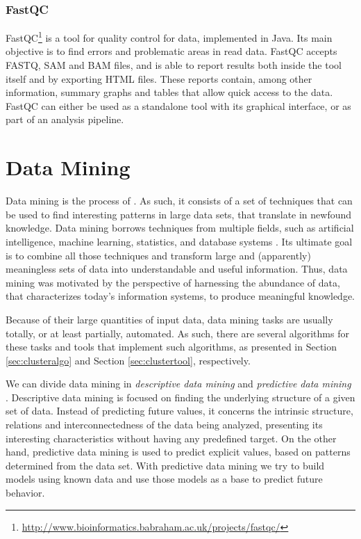 \subsubsection*{FastQC}

FastQC\footnote{\url{http://www.bioinformatics.babraham.ac.uk/projects/fastqc/}}
is a tool for quality control for \ngs{} data, implemented in Java. Its main
objective is to find errors and problematic areas in \ngs{} read data. FastQC
accepts FASTQ, SAM and BAM files, and is able to report results both inside the
tool itself and by exporting HTML files. These reports contain, among other
information, summary graphs and tables that allow quick access to the data.
FastQC can either be used as a standalone tool with its graphical interface, or
as part of an analysis pipeline.

\section{Data Mining}\label{sec:mlearning}


Data mining is the process of  \cite[p. 5]{han2006data}. As such, it consists of a
set of techniques that can be used to find interesting patterns in large data
sets, that translate in newfound knowledge. Data mining borrows techniques from
multiple fields, such as artificial intelligence, machine learning, statistics,
and database systems \cite{Chakrabarti2012}. Its ultimate goal is to combine all
those techniques and transform large and (apparently) meaningless sets of data
into understandable and useful information. Thus, data mining was motivated by
the perspective of harnessing the abundance of data, that characterizes today's
information systems, to produce meaningful knowledge.

Because of their large quantities of input data, data mining tasks are usually
totally, or at least partially, automated. As such, there are several algorithms
for these tasks and tools that implement such algorithms, as presented in
Section \ref{sec:clusteralgo} and Section \ref{sec:clustertool}, respectively.

We can divide data mining in \emph{descriptive data mining} and \emph{predictive
data mining} \cite{Fayyad1996}. Descriptive data mining is focused on finding
the underlying structure of a given set of data. Instead of predicting future
values, it concerns the intrinsic structure, relations and interconnectedness of
the data being analyzed, presenting its interesting characteristics without
having any predefined target. On the other hand, predictive data mining is used
to predict explicit values, based on patterns determined from the data set. With
predictive data mining we try to build models using known data and use those
models as a base to predict future behavior.

